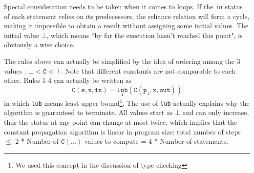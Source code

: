 Special consideration needs to be taken when it comes to loops. If the \texttt{in} status of each statement relies on its predecessors, the reliance relation will form a cycle, making it impossible to obtain a result without assigning some initial values. The initial value $\bot$, which means ``by far the execution hasn't reached this point", is obviously a wise choice.

The rules above can actually be simplified by the idea of ordering among the 3 values : $\bot < \mathtt{C} < \top$. Note that different constants are not comparable to each other. Rules 1-4 can actually be written as 
\begin{equation*}
\mathtt{C(s,x,in)=\underset{i}{lub}(C(p_i,x,out))}
\end{equation*}
in which \texttt{lub} means least upper bound\footnote{We used this concept in the discussion of type checking}. The use of \texttt{lub} actually explains why the algorithm is guaranteed to terminate. All values start as $\bot$ and can only increase, thus the status at any point can change at most twice, which implies that the constant propagation algorithm is linear in program size: total number of steps $\leq$ 2 * Number of $\mathtt{C(\dots)}$ values to compute = 4 * Number of statements.
